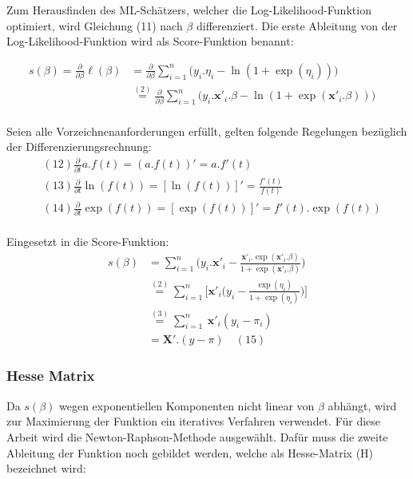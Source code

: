 \documentclass[12pt,]{article}
\begin{document}
Zum Herausfinden des ML-Schätzers, welcher die Log-Likelihood-Funktion
optimiert, wird Gleichung (11) nach \(\beta\) differenziert. Die erste
Ableitung von der Log-Likelihood-Funktion wird als Score-Funktion
benannt:

\[
\begin{aligned}
s(\beta) = \frac{\partial}{\partial \beta}  \ell(\beta) &= \frac{\partial}{\partial \beta} \sum_{i = 1}^{n} \Big( y_i.\eta_i - \ln (1 + \exp(\eta_i)) \Big) \quad \\
&\mathrel{\overset{(2)}{=}} \frac{\partial}{\partial \beta} \sum_{i = 1}^{n} \Big( y_i.\mathbf{x'}_i.\beta  - \ln (1 + \exp(\mathbf{x'}_i.\beta )) \Big) \quad \\ 
\end{aligned}
\]

Seien alle Vorzeichnenanforderungen erfüllt, gelten folgende Regelungen
bezüglich der Differenzierungsrechnung: \[
\begin{aligned}
&(12) \frac{\partial}{\partial t} a.f(t) = (a.f(t))' = a.f'(t) \\
&(13) \frac{\partial}{\partial t} \ln(f(t)) = [\ln(f(t))]' = \frac{f'(t)}{f(t)} \\ 
&(14) \frac{\partial}{\partial t} \exp(f(t)) = [\exp(f(t))]' = f'(t).\exp(f(t)) \\
\end{aligned}
\]

Eingesetzt in die Score-Funktion: \[
\begin{aligned}
s(\beta) &= \sum_{i = 1}^{n} \Bigg( y_i.\mathbf{x'}_i - \frac{\mathbf{x'}_i.\exp(\mathbf{x'}_i.\beta)}{1 + \exp(\mathbf{x'}_i.\beta)} \Bigg) \\
&\mathrel{\overset{(2)}{=}}\sum_{i = 1}^{n} \Bigg[ \mathbf{x'}_i \Bigg( y_i - \frac{\exp(\eta_i)}{1 + \exp(\eta_i)} \Bigg) \Bigg] \\
&\mathrel{\overset{(3)}{=}}  \sum_{i = 1}^{n} \ \mathbf{x'}_i ( y_i - \pi_i) \quad  \\
&= \mathbf{X}'.(y-\pi) \quad (15) 
\end{aligned}
\]

\subsubsection{Hesse Matrix}\label{hesse-matrix}

Da \(s(\beta)\) wegen exponentiellen Komponenten nicht linear von
\(\beta\) abhängt, wird zur Maximierung der Funktion ein iteratives
Verfahren verwendet. Für diese Arbeit wird die Newton-Raphson-Methode
ausgewählt. Dafür muss die zweite Ableitung der Funktion noch gebildet
werden, welche als Hesse-Matrix (H) bezeichnet wird:
\end{document}
